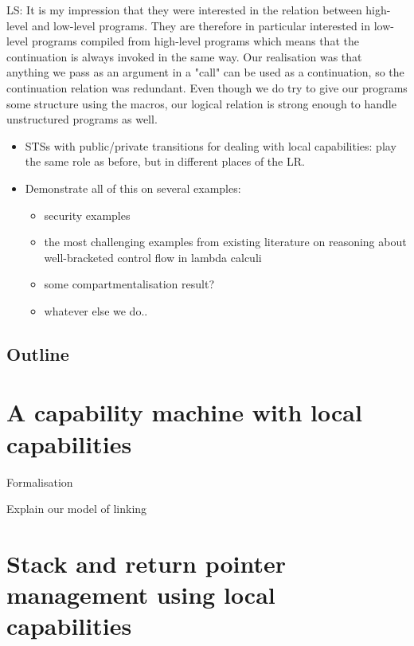\documentclass[compsoc,conference,letterpaper,fleqn]{IEEEtran}
\begin{document}
LS: It is my impression that they were interested in the relation
between high-level and low-level programs. They are therefore in
particular interested in low-level programs compiled from high-level
programs which means that the continuation is always invoked in the 
same way. Our realisation was that anything we pass as an argument 
in a "call" can be used as a continuation, so the continuation 
relation was redundant. Even though we do try to give our programs
some structure using the macros, our logical relation is strong enough
to handle unstructured programs as well.
\begin{itemize}
\item STSs with public/private transitions for dealing with local capabilities: play the same role as before, but in different places of the LR.
\end{itemize}
\begin{itemize}
\item Demonstrate all of this on several examples:
\begin{itemize}
\item security examples
\item the most challenging examples from existing literature on reasoning about well-bracketed control flow in lambda calculi
\item some compartmentalisation result?
\item whatever else we do..
\end{itemize}
\end{itemize}

\subsection{Outline}

\section{A capability machine with local capabilities}

Formalisation

Explain our model of linking

\section{Stack and return pointer management using local capabilities}
\end{document}
